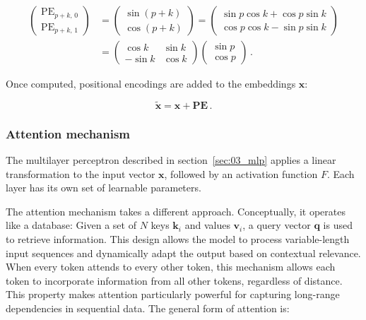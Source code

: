 \begin{align}
	\begin{pmatrix} \mathrm{PE}_{p + k, \, 0} \\ \mathrm{PE}_{p+k, \, 1} \end{pmatrix} & = 
	\begin{pmatrix} \sin \left( p + k \right) \\ \cos \left( p + k \right) \end{pmatrix} = 
	\begin{pmatrix}  \sin p \cos k + \cos p \sin k \\ \cos p \cos k - \sin p \sin k  \end{pmatrix} \\
	& = \begin{pmatrix} \cos k & \sin k \\ -\sin k & \cos k \end{pmatrix} \begin{pmatrix} \sin p \\ \cos p \end{pmatrix} \,.
\end{align}

\noindent Once computed, positional encodings are added to the embeddings $\mathbf{x}$: 

\begin{equation}
\label{eq:pos_enc_add}
    \mathbf{\tilde x} = \mathbf{x} + \mathbf{PE} \,.
\end{equation}


\subsubsection{Attention mechanism}
\label{sec:03_attention_mechanism}

The multilayer perceptron described in section~\ref{sec:03_mlp} applies a linear transformation to the input vector $\mathbf{x}$, followed by an activation function $F$. Each layer has its own set of learnable parameters.

The attention mechanism takes a different approach. Conceptually, it operates like a database: Given a set of $N$ keys $\mathbf{k}_i$ and values $\mathbf{v}_i$, a query vector $\mathbf{q}$ is used to retrieve information. 
This design allows the model to process variable-length input sequences and dynamically adapt the output based on contextual relevance. When every token attends to every other token, this mechanism allows each token to incorporate information from all other tokens, regardless of distance. This property makes attention particularly powerful for capturing long-range dependencies in sequential data. 
The general form of attention is:

